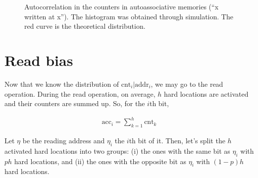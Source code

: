 \documentclass[12pt]{article}
\begin{document}
\begin{figure}[h!]
  \centering

  \caption{Autocorrelation in the counters in autoassociative memories (``x written at x''). The histogram was obtained through simulation. The red curve is the theoretical distribution.}
  \label{fig:sdm-corr-prob}
\end{figure}



\section{Read bias}

Now that we know the distribution of $\text{cnt}_i | \text{addr}_i$, we may go to the read operation. During the read operation, on average, $h$ hard locations are activated and their counters are summed up. So, for the $i$th bit,

\begin{align}
\text{acc}_i = \sum_{k=1}^{h} \text{cnt}_k
\end{align}

Let $\eta$ be the reading address and $\eta_i$ the $i$th bit of it. Then, let's split the $h$ activated hard locations into two groups: (i) the ones with the same bit as $\eta_i$ with $ph$ hard locations, and (ii) the ones with the opposite bit as $\eta_i$ with $(1-p)h$ hard locations.
\end{document}
